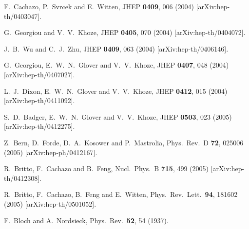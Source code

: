 \documentclass[12pt]{iopart}
\begin{document}
\begin{thebibliography}{99}
  F.~Cachazo, P.~Svrcek and E.~Witten,
  JHEP {\bf 0409}, 006 (2004)
  [arXiv:hep-th/0403047].

  G.~Georgiou and V.~V.~Khoze,
  JHEP {\bf 0405}, 070 (2004)
  [arXiv:hep-th/0404072].
 
  J.~B.~Wu and C.~J.~Zhu,
  JHEP {\bf 0409}, 063 (2004)
  [arXiv:hep-th/0406146].
  
  G.~Georgiou, E.~W.~N.~Glover and V.~V.~Khoze,
  JHEP {\bf 0407}, 048 (2004)
  [arXiv:hep-th/0407027].
  
  L.~J.~Dixon, E.~W.~N.~Glover and V.~V.~Khoze,
  JHEP {\bf 0412}, 015 (2004)
  [arXiv:hep-th/0411092].
    
  S.~D.~Badger, E.~W.~N.~Glover and V.~V.~Khoze,
  JHEP {\bf 0503}, 023 (2005)
  [arXiv:hep-th/0412275].

  Z.~Bern, D.~Forde, D.~A.~Kosower and P.~Mastrolia,
  Phys.\ Rev.\ D {\bf 72}, 025006 (2005)
  [arXiv:hep-ph/0412167].
    
  R.~Britto, F.~Cachazo and B.~Feng,
  Nucl.\ Phys.\ B {\bf 715}, 499 (2005)
  [arXiv:hep-th/0412308].

  R.~Britto, F.~Cachazo, B.~Feng and E.~Witten,
  Phys.\ Rev.\ Lett.\  {\bf 94}, 181602 (2005)
  [arXiv:hep-th/0501052].

  F.~Bloch and A.~Nordsieck,
  Phys.\ Rev.\  {\bf 52}, 54 (1937).
  

\end{thebibliography}
\end{document}
